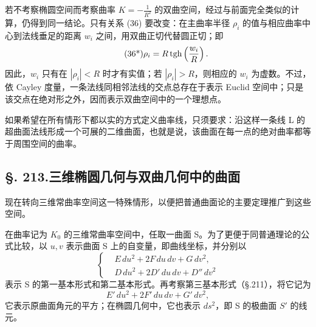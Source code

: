 若不考察椭圆空间而考察曲率 $K=-\frac1{R^2}$ 的双曲空间，经过与前面完全类似的计算，仍得到同一结论。只有关系 (36) 要改变：在主曲率半径 $\rho_i$ 的值与相应曲率中心到法线垂足的距离 $w_i$ 之间，用双曲正切代替圆正切；即
\[
\tag{36*}
\rho_i=R\operatorname{tgh}\left(\frac{w_i}{R}\right).
\]
因此，$w_i$ 只有在 $|\rho_i|<R$ 时才有实值；若 $|\rho_i|>R$，则相应的 $w_i$ 为虚数。不过，依 Cayley 度量，一条法线同相邻法线的交点总存在于表示 Euclid 空间中；只是该交点在绝对形之外，因而表示双曲空间中的一个理想点。

如果希望在所有情形下都以实的方式定义曲率线，只须要求：沿这样一条线 L 的超曲面法线形成一个可展的二维曲面，也就是说，该曲面在每一点的绝对曲率都等于周围空间的曲率。

\subsection*{\S. 213.\quad 三维椭圆几何与双曲几何中的曲面}

现在转向三维常曲率空间这一特殊情形，以便把普通曲面论的主要定理推广到这些空间。

在曲率记为 $K_0$ 的三维常曲率空间中，任取一曲面 S。为了更便于同普通理论的公式比较，以 $u,v$ 表示曲面 S 上的自变量，即曲线坐标，并分别以
\[
\tag{37}
\left\{
\begin{aligned}
&E\,du^2+2F\,du\,dv+G\,dv^2,\\
&D\,du^2+2D'\,du\,dv+D''\,dv^2
\end{aligned}\right.
\]
表示 S 的第一基本形式和第二基本形式。再考察第三基本形式（\S.211），将它记为
\[
\tag{37*}
E'\,du^2+2F'\,du\,dv+G'\,dv^2,
\]
它表示原曲面角元的平方；在椭圆几何中，它也表示 $ds^2$，即 S 的极曲面 $S'$ 的线元。

